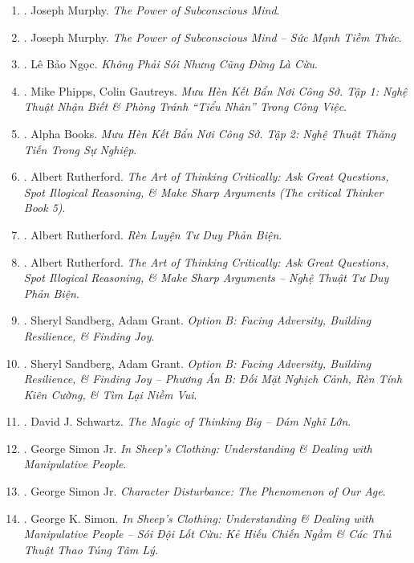 \documentclass{article}
\begin{document}
\begin{enumerate}
	\item \cite{Murphy2011}. Joseph Murphy. {\it The Power of Subconscious Mind}.\hfill{\sf[reading]}
	\item \cite{Murphy2021}. Joseph Murphy. {\it The Power of Subconscious Mind -- Sức Mạnh Tiềm Thức}.\hfill{\sf[done]}
	\item \cite{Ngoc2022}. Lê Bảo Ngọc. {\it Không Phải Sói Nhưng Cũng Đừng Là Cừu}.\hfill{\sf[done]}
	\item \cite{Phipps_Gautreys_muu_hen_ke_ban_tap_1}. Mike Phipps, Colin Gautreys. {\it Mưu Hèn Kết Bẩn Nơi Công Sở. Tập 1: Nghệ Thuật Nhận Biết \& Phòng Tránh ``Tiểu Nhân'' Trong Công Việc}.\hfill{\sf[done]}
	\item \cite{muu_hen_ke_ban_tap_2}. Alpha Books. {\it Mưu Hèn Kết Bẩn Nơi Công Sở. Tập 2: Nghệ Thuật Thăng Tiến Trong Sự Nghiệp}.\hfill{\sf[done]}
	\item \cite{Rutherford2020}. Albert Rutherford. {\it The Art of Thinking Critically: Ask Great Questions, Spot Illogical Reasoning, \& Make Sharp Arguments (The critical Thinker Book 5)}.\hfill{\sf[reading]}
	\item \cite{Rutherford2022}. Albert Rutherford. {\it Rèn Luyện Tư Duy Phản Biện}.\hfill{\sf[done]}
	\item \cite{Rutherford2023}. Albert Rutherford. {\it The Art of Thinking Critically: Ask Great Questions, Spot Illogical Reasoning, \& Make Sharp Arguments -- Nghệ Thuật Tư Duy Phản Biện}.\hfill{\sf[done]}
	\item \cite{Sandberg_Grant2017}. Sheryl Sandberg, Adam Grant. {\it Option B: Facing Adversity, Building Resilience, \& Finding Joy}.\hfill{\sf[reading]}
	\item \cite{Sandberg_Grant2019}. Sheryl Sandberg, Adam Grant. {\it Option B: Facing Adversity, Building Resilience, \& Finding Joy -- Phương Án B: Đối Mặt Nghịch Cảnh, Rèn Tính Kiên Cường, \& Tìm Lại Niềm Vui}.\hfill{\sf[done]}
	\item \cite{Schwartz2019}. David J. Schwartz. {\it The Magic of Thinking Big -- Dám Nghĩ Lớn}.\hfill{\sf[done]}
	\item \cite{Simon2010}. George Simon Jr. {\it In Sheep's Clothing: Understanding \& Dealing with Manipulative People}.\hfill{\sf[reading]}
	\item \cite{Simon2011}. George Simon Jr. {\it Character Disturbance: The Phenomenon of Our Age}.\hfill{\sf[done]}
	\item \cite{Simon2022}. George K. Simon. {\it In Sheep's Clothing: Understanding \& Dealing with Manipulative People -- Sói Đội Lốt Cừu: Kẻ Hiếu Chiến Ngầm \& Các Thủ Thuật Thao Túng Tâm Lý}.\hfill{\sf[done]}

\end{enumerate}
\end{document}
